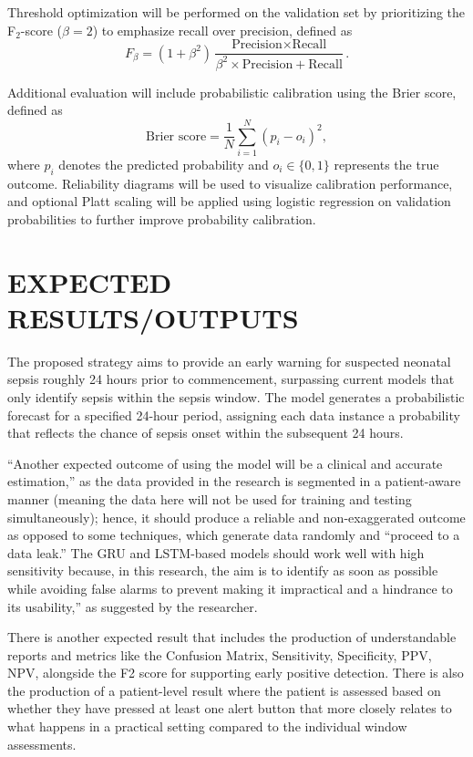 \documentclass[conference]{IEEEtran}
\begin{document}
Threshold optimization will be performed on the validation set by prioritizing the F$_2$-score ($\beta = 2$) to emphasize recall over precision, defined as
\begin{equation}
F_\beta = (1 + \beta^2)\frac{\text{Precision} \times \text{Recall}}{\beta^2 \times \text{Precision} + \text{Recall}}.
\end{equation}

Additional evaluation will include probabilistic calibration using the Brier score, defined as
\begin{equation}
\text{Brier score} = \frac{1}{N} \sum_{i=1}^{N} (p_i - o_i)^2,
\end{equation}
where $p_i$ denotes the predicted probability and $o_i \in \{0,1\}$ represents the true outcome.
Reliability diagrams will be used to visualize calibration performance, and optional Platt scaling will be applied using logistic regression on validation probabilities to further improve probability calibration.



\section {EXPECTED RESULTS/OUTPUTS}
The proposed strategy aims to provide an early warning for suspected neonatal sepsis roughly 24 hours prior to commencement, surpassing current models that only identify sepsis within the sepsis window. The model generates a probabilistic forecast for a specified 24-hour period, assigning each data instance a probability that reflects the chance of sepsis onset within the subsequent 24 hours.

“Another expected outcome of using the model will be a clinical and accurate estimation,” as the data provided in the research is segmented in a patient-aware manner (meaning the data here will not be used for training and testing simultaneously); hence, it should produce a reliable and non-exaggerated outcome as opposed to some techniques, which generate data randomly and “proceed to a data leak.” The GRU and LSTM-based models should work well with high sensitivity because, in this research, the aim is to identify as soon as possible while avoiding false alarms to prevent making it impractical and a hindrance to its usability,” as suggested by the researcher.

There is another expected result that includes the production of understandable reports and metrics like the Confusion Matrix, Sensitivity, Specificity, PPV, NPV, alongside the F2 score for supporting early positive detection. There is also the production of a patient-level result where the patient is assessed based on whether they have pressed at least one alert button that more closely relates to what happens in a practical setting compared to the individual window assessments.
\end{document}
